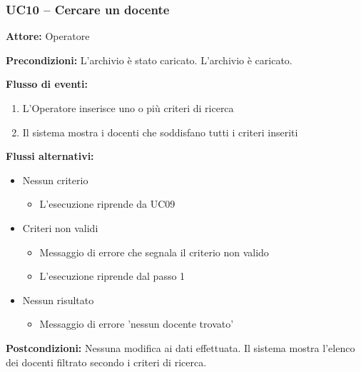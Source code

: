 \documentclass[a4paper,11pt]{article}
\begin{document}
\begin{samepage}
\subsubsection*{UC10 -- Cercare un docente}
\begin{ucbox}

\noindent\textbf{Attore:} Operatore\par
\noindent\textbf{Precondizioni:} L'archivio è stato caricato. L'archivio è caricato.\par

\noindent\textbf{Flusso di eventi:}
\begin{enumerate}
\item L'Operatore inserisce uno o più criteri di ricerca \item Il sistema mostra i docenti che soddisfano tutti i criteri inseriti \end{enumerate}
\noindent\textbf{Flussi alternativi:}
\begin{itemize}
\item[1a.] Nessun criterio
\begin{itemize}
\item L'esecuzione riprende da UC09
\end{itemize}
\item[1b.] Criteri non validi
\begin{itemize}
\item Messaggio di errore che segnala il criterio non valido
\item L'esecuzione riprende dal passo 1
\end{itemize}
\item[2a.] Nessun risultato
\begin{itemize}
\item Messaggio di errore 'nessun docente trovato'
\end{itemize}
\end{itemize}
\noindent\textbf{Postcondizioni:} Nessuna modifica ai dati effettuata. Il sistema mostra l'elenco dei docenti filtrato secondo i criteri di ricerca.\par
\end{ucbox}
\end{samepage}
\end{document}
